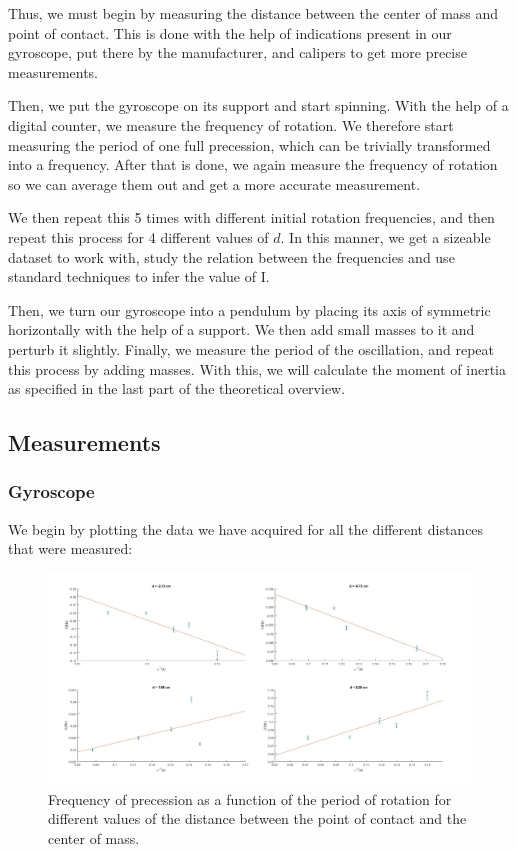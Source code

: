 \documentclass[a4paper,12pt]{article}
\begin{document}
Thus, we must begin by measuring the distance between the center of mass and point of contact. This is done with the help of indications present in our gyroscope, put there
by the manufacturer, and calipers to get more precise measurements.

Then, we put the gyroscope on its support and start spinning. With the help of a digital counter, we measure the frequency of rotation. 
We therefore start measuring the period of one full precession, which can be trivially transformed into a frequency. After that is done, we again measure the frequency of rotation so we can average them out and get a more accurate measurement.

We then repeat this 5 times with different initial rotation frequencies, and then repeat this process for 4 different values of $d$.
In this manner, we get a sizeable dataset to work with, study the relation between the frequencies and use standard techniques to infer the value of I. 

Then, we turn our gyroscope into a pendulum by placing its axis of symmetric horizontally with the help of a support. We then 
add small masses to it and perturb it slightly. Finally, we measure the period of the oscillation, and repeat this process by adding masses.
With this, we will calculate the moment of inertia as specified in the last part of the theoretical overview.

\subsection{Measurements}
\subsubsection{Gyroscope}
We begin by plotting the data we have acquired for all the different distances that were measured:


\begin{figure}[h!]
	\label{foda}
	\caption{Frequency of precession as a function of the period of rotation for different values of the distance between the point of contact and the center of mass.}
	\includegraphics[width=\textwidth]{correct.jpg}
\end{figure} 
\end{document}
